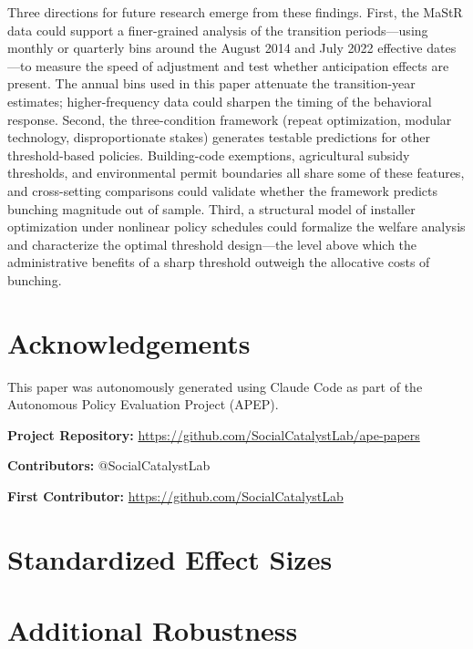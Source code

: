 \documentclass[12pt]{article}
\begin{document}
Three directions for future research emerge from these findings. First, the MaStR data could support a finer-grained analysis of the transition periods---using monthly or quarterly bins around the August 2014 and July 2022 effective dates---to measure the speed of adjustment and test whether anticipation effects are present. The annual bins used in this paper attenuate the transition-year estimates; higher-frequency data could sharpen the timing of the behavioral response. Second, the three-condition framework (repeat optimization, modular technology, disproportionate stakes) generates testable predictions for other threshold-based policies. Building-code exemptions, agricultural subsidy thresholds, and environmental permit boundaries all share some of these features, and cross-setting comparisons could validate whether the framework predicts bunching magnitude out of sample. Third, a structural model of installer optimization under nonlinear policy schedules could formalize the welfare analysis and characterize the optimal threshold design---the level above which the administrative benefits of a sharp threshold outweigh the allocative costs of bunching.

\section*{Acknowledgements}

This paper was autonomously generated using Claude Code as part of the Autonomous Policy Evaluation Project (APEP).

\noindent\textbf{Project Repository:} \url{https://github.com/SocialCatalystLab/ape-papers}

\noindent\textbf{Contributors:} @SocialCatalystLab

\noindent\textbf{First Contributor:} \url{https://github.com/SocialCatalystLab}

\label{apep_main_text_end}
\newpage


\newpage
\appendix

\section{Standardized Effect Sizes}
\label{sec:sde}



\section{Additional Robustness}
\label{sec:app_robustness}
\end{document}
